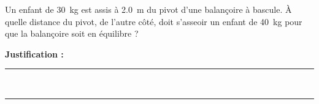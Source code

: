 Un enfant de \qty{30}{kg} est assis à \qty{2.0}{m} du pivot d'une balançoire à bascule. À quelle distance du pivot, de l'autre côté, doit s'asseoir un enfant de \qty{40}{kg} pour que la balançoire soit en équilibre ?

\choices

\noindent\textbf{Justification :} \hrulefill \\[2.5ex]
\rule{\linewidth}{0.4pt} \\[2.5ex]
\rule{\linewidth}{0.4pt}
\vfill
